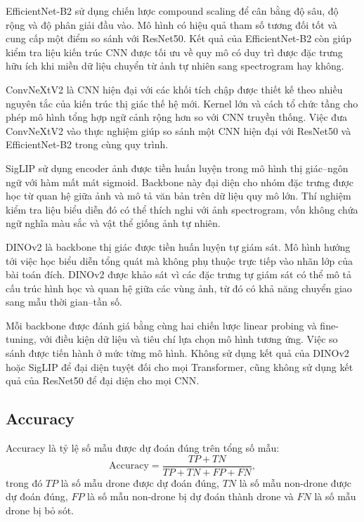 \documentclass[../DoAn.tex]{subfiles}
\begin{document}
EfficientNet-B2 sử dụng chiến lược compound scaling để cân bằng độ sâu, độ rộng và độ phân giải đầu vào. Mô hình có hiệu quả tham số tương đối tốt và cung cấp một điểm so sánh với ResNet50. Kết quả của EfficientNet-B2 còn giúp kiểm tra liệu kiến trúc CNN được tối ưu về quy mô có duy trì được đặc trưng hữu ích khi miền dữ liệu chuyển từ ảnh tự nhiên sang spectrogram hay không.

ConvNeXtV2 là CNN hiện đại với các khối tích chập được thiết kế theo nhiều nguyên tắc của kiến trúc thị giác thế hệ mới. Kernel lớn và cách tổ chức tầng cho phép mô hình tổng hợp ngữ cảnh rộng hơn so với CNN truyền thống. Việc đưa ConvNeXtV2 vào thực nghiệm giúp so sánh một CNN hiện đại với ResNet50 và EfficientNet-B2 trong cùng quy trình.

SigLIP sử dụng encoder ảnh được tiền huấn luyện trong mô hình thị giác--ngôn ngữ với hàm mất mát sigmoid. Backbone này đại diện cho nhóm đặc trưng được học từ quan hệ giữa ảnh và mô tả văn bản trên dữ liệu quy mô lớn. Thí nghiệm kiểm tra liệu biểu diễn đó có thể thích nghi với ảnh spectrogram, vốn không chứa ngữ nghĩa màu sắc và vật thể giống ảnh tự nhiên.

DINOv2 là backbone thị giác được tiền huấn luyện tự giám sát. Mô hình hướng tới việc học biểu diễn tổng quát mà không phụ thuộc trực tiếp vào nhãn lớp của bài toán đích. DINOv2 được khảo sát vì các đặc trưng tự giám sát có thể mô tả cấu trúc hình học và quan hệ giữa các vùng ảnh, từ đó có khả năng chuyển giao sang mẫu thời gian--tần số.

Mỗi backbone được đánh giá bằng cùng hai chiến lược linear probing và fine-tuning, với điều kiện dữ liệu và tiêu chí lựa chọn mô hình tương ứng. Việc so sánh được tiến hành ở mức từng mô hình. Không sử dụng kết quả của DINOv2 hoặc SigLIP để đại diện tuyệt đối cho mọi Transformer, cũng không sử dụng kết quả của ResNet50 để đại diện cho mọi CNN.

\subsection{Accuracy}

Accuracy là tỷ lệ số mẫu được dự đoán đúng trên tổng số mẫu:
\begin{equation}
    \mathrm{Accuracy}
    =
    \frac{TP+TN}{TP+TN+FP+FN},
    \label{eq:accuracy_ch4}
\end{equation}
trong đó $TP$ là số mẫu drone được dự đoán đúng, $TN$ là số mẫu non-drone được dự đoán đúng, $FP$ là số mẫu non-drone bị dự đoán thành drone và $FN$ là số mẫu drone bị bỏ sót.
\end{document}
